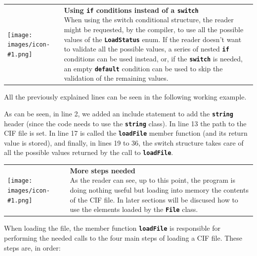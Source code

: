 \documentclass[11pt,twoside,openany,x11names,svgnames]{memoir}
\makeatletter
\newcommand{\IconNote}[3]
{
	\begin{table}[ht]
	\begin{tabular}{ lm{\dimexpr\textwidth-8\tabcolsep-\wd0}@{}}
		\toprule
		\texttt{[image: images/icon-\#1.png]}
		&
		\parbox[t]{155mm}{
		\textbf{#2} \\
		#3
		}
	\end{tabular}
\end{table}
}
\makeatother
\begin{document}
\IconNote
	{info}
	{Using \textbf{\texttt{if}} conditions instead of a \textbf{\texttt{switch}}}
	{When using the switch conditional structure, the reader might be requested, by the compiler, to use all the possible values of the \textbf{\texttt{LoadStatus}} enum. If the reader doesn't want to validate all the possible values, a series of nested \textbf{\texttt{if}} conditions can be used instead, or, if the \textbf{\texttt{switch}} is needed, an empty \textbf{\texttt{default}} condition can be used to skip the validation of the remaining values.}
	
All the previously explained lines can be seen in the following working example.



As can be seen, in line 2, we added an include statement to add the \textbf{\texttt{string}} header (since the code needs to use the \textbf{\texttt{string}} class). In line 13 the path to the CIF file is set. In line 17 is called the \textbf{\texttt{loadFile}} member function (and its return value is stored), and finally, in lines 19 to 36, the switch structure takes care of all the possible values returned by the call to \textbf{\texttt{loadFile}}.

\IconNote
	{info}
	{More steps needed}
	{As the reader can see, up to this point, the program is doing nothing useful but loading into memory the contents of the CIF file. In later sections will be discused how to use the elements loaded by the \textbf{\texttt{File}} class.}
	
When loading the file, the member function \textbf{\texttt{loadFile}} is responsible for performing the needed calls to the four main steps of loading a CIF file. These steps are, in order:
\end{document}
